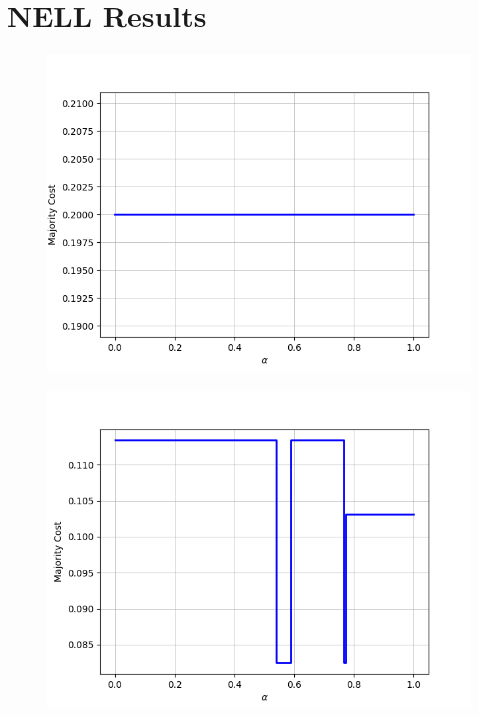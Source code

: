 \chapter{NELL Results}
\label{app:nell}

\begin{figure}[h]
\centering
\begin{minipage}{.24\textwidth}
  \centering
  {\includegraphics[width=\linewidth]{plots/nell-ac/animal}}
\end{minipage}
\begin{minipage}{.24\textwidth}
  \centering
  {\includegraphics[width=\linewidth]{plots/nell-ac/arthropod}}
\end{minipage}

\end{figure}
